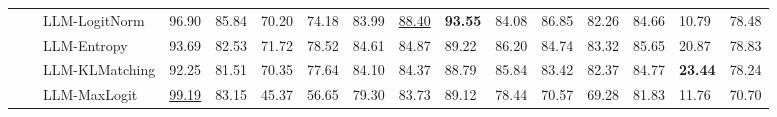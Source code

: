 \begin{table}[ht!]
\begin{tabularx}{\textwidth}{@{}l l l |l *{11}{Y}|Y@{}}
 &  & LLM-LogitNorm & 96.90 & 85.84 & 70.20 & 74.18 & 83.99 & \underline{88.40} & \textbf{93.55} & 84.08 & 86.85 & 82.26 & 84.66 & 10.79 & 78.48 \\
 &  & LLM-Entropy & 93.69 & 82.53 & 71.72 & 78.52 & 84.61 & 84.87 & 89.22 & 86.20 & 84.74 & 83.32 & 85.65 & 20.87 & 78.83 \\
 &  & LLM-KLMatching & 92.25 & 81.51 & 70.35 & 77.64 & 84.10 & 84.37 & 88.79 & 85.84 & 83.42 & 82.37 & 84.77 & \textbf{23.44} & 78.24 \\
 &  & LLM-MaxLogit & \underline{99.19} & 83.15 & 45.37 & 56.65 & 79.30 & 83.73 & 89.12 & 78.44 & 70.57 & 69.28 & 81.83 & 11.76 & 70.70 \\
\bottomrule
\end{tabularx}
\label{table::openset_LCR1}
\end{table}